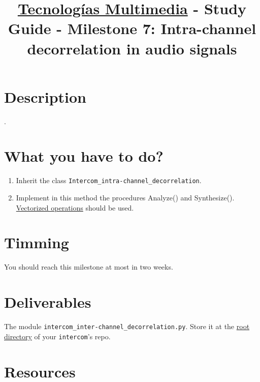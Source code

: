 \title{\href{https://www.ual.es/estudios/grados/presentacion/plandeestudios/asignatura/4015/40154321?idioma=zh_CN}{Tecnologías Multimedia} - Study Guide - Milestone 7: Intra-channel decorrelation in audio signals}

\maketitle

\section{Description}

\cite{kahrs2002applications}.

\section{What you have to do?}

\begin{enumerate}
\item Inherit the class \texttt{Intercom\_intra-channel\_decorrelation}.
\item Implement in this method the procedures Analyze() and
  Synthesize(). \href{https://www.oreilly.com/library/view/python-for-data/9781449323592/ch04.html}{Vectorized
    operations} should be used.
\end{enumerate}

\section{Timming}

You should reach this milestone at most in two weeks.

\section{Deliverables}

The module \texttt{intercom\_inter-channel\_decorrelation.py}. Store
it at the
\href{https://github.com/Tecnologias-multimedia/intercom}{root
  directory} of your \texttt{intercom}'s repo.

\section{Resources}


